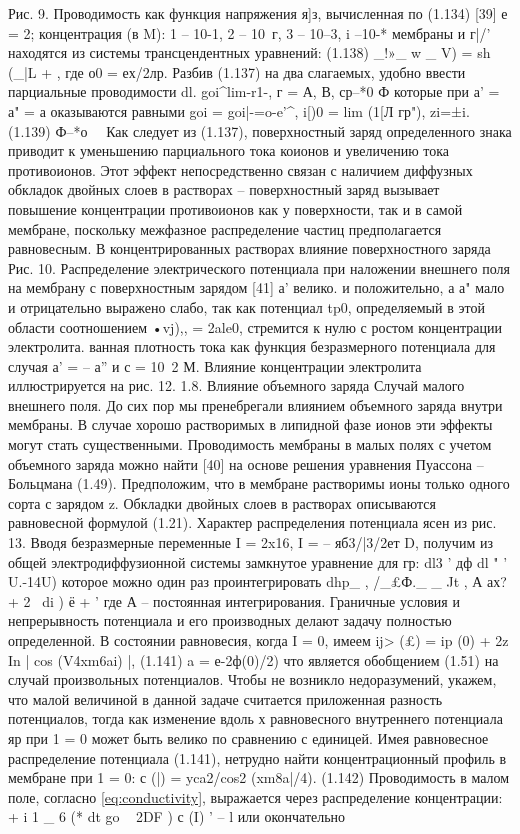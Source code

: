 {Рис. 9. Проводимость как функция напряжения я]з, вычисленная по (1.134) [39]
е = 2; концентрация (в M): 1 -- 10-1, 2 -- 10~г, 3 -- 10--3, i --10-*
мембраны и г|/' находятся из системы трансцендентных уравнений:
(1.138)
_!»_ w _ V) = sh (_|L + ,
где о0 = ех/2лр. Разбив (1.137) на два слагаемых, удобно ввести парциальные проводимости dl.
goi^lim-r1-, г = А, В,
ср--*0 Ф
которые при а' = а" = а оказываются равными
goi = goi|-=o-e'^, i[)0 = lim (1[Л гр"), zi=±i. (1.139)
Ф--*о 
Как следует из (1.137), поверхностный заряд определенного знака приводит к уменьшению парциального тока коионов и увеличению тока противоионов. Этот эффект непосредственно связан с наличием диффузных обкладок двойных слоев в растворах -- поверхностный заряд вызывает повышение концентрации противоионов как у поверхности, так и в самой мембране, поскольку межфазное распределение частиц предполагается равновесным. В концентрированных растворах влияние поверхностного заряда
Рис. 10. Распределение электрического потенциала при наложении внешнего поля на мембрану с поверхностным зарядом [41]
а' велико. и положительно, а а" мало и отрицательно
выражено слабо, так как потенциал tp0, определяемый в этой области соотношением •vj),, = 2ale0, стремится к нулю с ростом концентрации электролита.
ванная плотность тока как функция безразмерного потенциала для случая а' = -- а” и с = 10~2 М. Влияние концентрации электролита иллюстрируется на рис. 12.
1.8. Влияние объемного заряда
Случай малого внешнего поля. До сих пор мы пренебрегали влиянием объемного заряда внутри мембраны. В случае хорошо растворимых в липидной фазе ионов эти эффекты могут стать существенными. Проводимость мембраны в малых полях с учетом объемного заряда можно найти [40] на основе решения уравнения Пуассона -- Больцмана (1.49). Предположим, что в мембране растворимы ионы только одного сорта с зарядом z. Обкладки двойных слоев в растворах описываются равновесной формулой (1.21). Характер распределения потенциала ясен из рис. 13. Вводя безразмерные переменные
I = 2x16, I = -- яб3/|3/2ет D,
получим из общей электродиффузионной системы замкнутое уравнение для гр:
dl3 ' дф dl " ’ U.-14U)
которое можно один раз проинтегрировать
dhp_ , /_£Ф.\а _ _ Jt , А
ах? + 2 \ di ) ё + ’
где А -- постоянная интегрирования.
Граничные условия и непрерывность потенциала и его производных делают задачу полностью определенной. В состоянии равновесия, когда I = 0, имеем
ij> (£) = ip (0) + 2z In | cos (V4xm6ai) |, (1.141)
a = е-2ф(0)/2)
что является обобщением (1.51) на случай произвольных потенциалов. Чтобы не возникло недоразумений, укажем, что малой величиной в данной задаче считается приложенная разность потенциалов, тогда как изменение вдоль х равновесного внутреннего потенциала яр при 1 = 0 может быть велико по сравнению с единицей.
Имея равновесное распределение потенциала (1.141), нетрудно найти концентрационный профиль в мембране при 1 = 0:
с (|) = yca2/cos2 (xm8a|/4). (1.142)
Проводимость в малом поле, согласно \eqref{eq:conductivity}, выражается через
распределение концентрации:
+ i
1 _ 6 (* dt
go ~ 2DF ) с (I) ’
-- l
или окончательно


}
